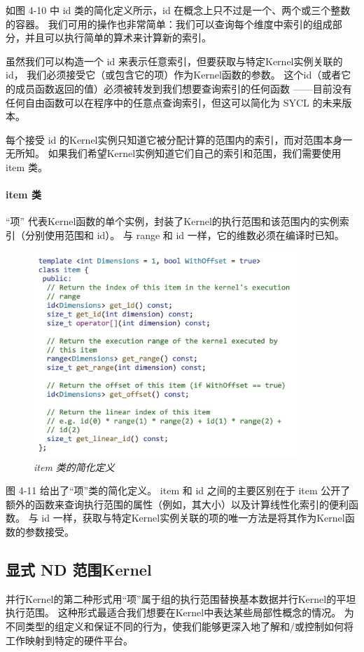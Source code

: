 如图 4-10 中 id 类的简化定义所示，id 在概念上只不过是一个、两个或三个整数的容器。 
我们可用的操作也非常简单：我们可以查询每个维度中索引的组成部分，并且可以执行简单的算术来计算新的索引。

虽然我们可以构造一个 id 来表示任意索引，但要获取与特定Kernel实例关联的 id，
我们必须接受它（或包含它的项）作为Kernel函数的参数。 
这个id（或者它的成员函数返回的值）必须被转发到我们想要查询索引的任何函数
——目前没有任何自由函数可以在程序中的任意点查询索引，但这可以简化为 SYCL 的未来版本。

每个接受 id 的Kernel实例只知道它被分配计算的范围内的索引，而对范围本身一无所知。 
如果我们希望Kernel实例知道它们自己的索引和范围，我们需要使用 item 类。

\paragraph{item 类}

“项” 代表Kernel函数的单个实例，封装了Kernel的执行范围和该范围内的实例索引（分别使用范围和 id）。 
与 range 和 id 一样，它的维数必须在编译时已知。

\begin{figure}[H]
	\centering
	\includegraphics[width=0.9\textwidth]{figs/F4.11.png}
	\caption{\textit{item 类的简化定义}}
\end{figure}

图 4-11 给出了“项”类的简化定义。 
item 和 id 之间的主要区别在于 item 公开了额外的函数来查询执行范围的属性（例如，其大小）以及计算线性化索引的便利函数。 
与 id 一样，获取与特定Kernel实例关联的项的唯一方法是将其作为Kernel函数的参数接受。

\subsection{显式 ND 范围Kernel}
并行Kernel的第二种形式用“项”属于组的执行范围替换基本数据并行Kernel的平坦执行范围。 
这种形式最适合我们想要在Kernel中表达某些局部性概念的情况。 
为不同类型的组定义和保证不同的行为，使我们能够更深入地了解和/或控制如何将工作映射到特定的硬件平台。

